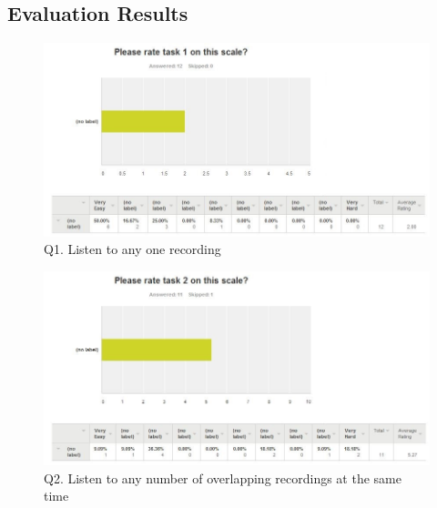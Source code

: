 \documentclass{l3proj}
\begin{document}
\newpage
\subsection{Evaluation Results}

\begin{figure}[ht!]
\centering
\includegraphics[width=\textwidth]{images/question-1-stats.jpg}
\caption{Q1. Listen to any one recording}
\end{figure}
\begin{figure}[ht!]
\centering
\includegraphics[width=\textwidth]{images/question-2-stats.jpg}
\caption{Q2. Listen to any number of overlapping recordings at the same time}
\end{figure}
\end{document}
